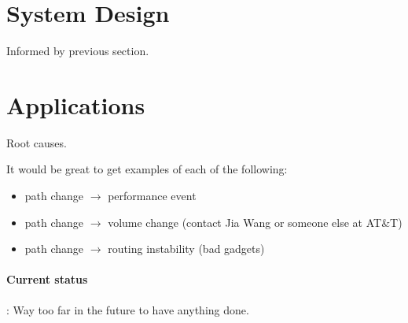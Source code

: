 \section{System Design}

Informed by previous section.


\section{Applications}

Root causes.

It would be great to get examples of each of the following:

\begin{itemize}
	\item path change $\rightarrow$ performance event
	\item path change $\rightarrow$ volume change (contact Jia Wang or someone else at AT\&T)
	\item path change $\rightarrow$ routing instability (bad gadgets) 
\end{itemize}

\paragraph{Current status}: Way too far in the future to have anything done.